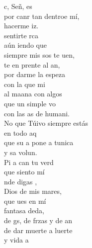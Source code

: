 \documentclass[12pt]{article}
\begin{document}
\begin{multicols*}{2}
\begin{cancion}%
	c, Señ,  es \\
	por canr tan dentroe mí,\\
	 hacerme iz.\\
	 sentirte rca\\
	aún iendo que\\
	siempre mis sos te uen,\\
	te en prente al an,\\
	por darme la espeza  \\
	con la que mi \\
	al maana con algos \\
	que un simple vo\\
	con las as de humani.\\
	No que Túivo siempre estás\\
	en todo aq\\
	que su a pone a tunica\\
	y sa volun.\\
\jump
	Pi a can tu verd \\
	que siento  mí\\
	nde digas ,\\
	Dios de mis mares,\\
	que ues en mí\\
	 fantasa deda,\\
	de gs, de frzas y de an\\
	de dar muerte a luerte \\
	y vida a \\

\end{cancion}
\end{multicols*}
\end{document}
